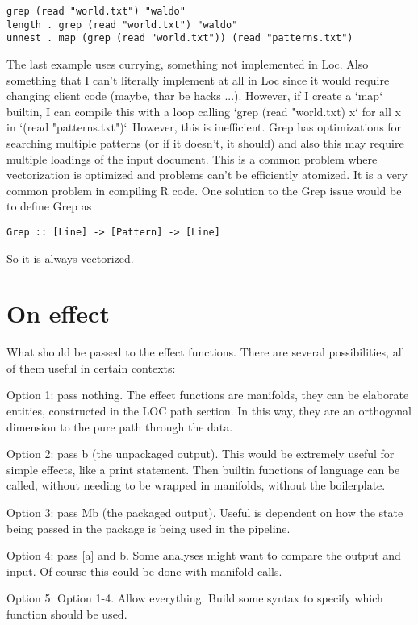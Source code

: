 \documentclass[12pt]{article}
\begin{document}
\begin{verbatim}
grep (read "world.txt") "waldo"
length . grep (read "world.txt") "waldo"
unnest . map (grep (read "world.txt")) (read "patterns.txt")
\end{verbatim}

The last example uses currying, something not implemented in Loc. Also
something that I can't literally implement at all in Loc since it would require
changing client code (maybe, thar be hacks ...). However, if I create a `map`
builtin, I can compile this with a loop calling `grep (read "world.txt) x` for
all x in `(read "patterns.txt")`. However, this is inefficient. Grep has
optimizations for searching multiple patterns (or if it doesn't, it should) and
also this may require multiple loadings of the input document. This is a common
problem where vectorization is optimized and problems can't be efficiently
atomized. It is a very common problem in compiling R code. One solution to the
Grep issue would be to define Grep as

\begin{verbatim}
Grep :: [Line] -> [Pattern] -> [Line]
\end{verbatim}

So it is always vectorized.

\section{On effect}

What should be passed to the effect functions. There are several possibilities,
all of them useful in certain contexts:

Option 1: pass nothing. The effect functions are manifolds, they can be
elaborate entities, constructed in the LOC path section. In this way, they are
an orthogonal dimension to the pure path through the data.

Option 2: pass b (the unpackaged output). This would be extremely useful for
simple effects, like a print statement. Then builtin functions of language can
be called, without needing to be wrapped in manifolds, without the boilerplate.

Option 3: pass Mb (the packaged output). Useful is dependent on how the state
being passed in the package is being used in the pipeline.

Option 4: pass [a] and b. Some analyses might want to compare the output and
input. Of course this could be done with manifold calls.

Option 5: Option 1-4. Allow everything. Build some syntax to specify which
function should be used.
\end{document}

